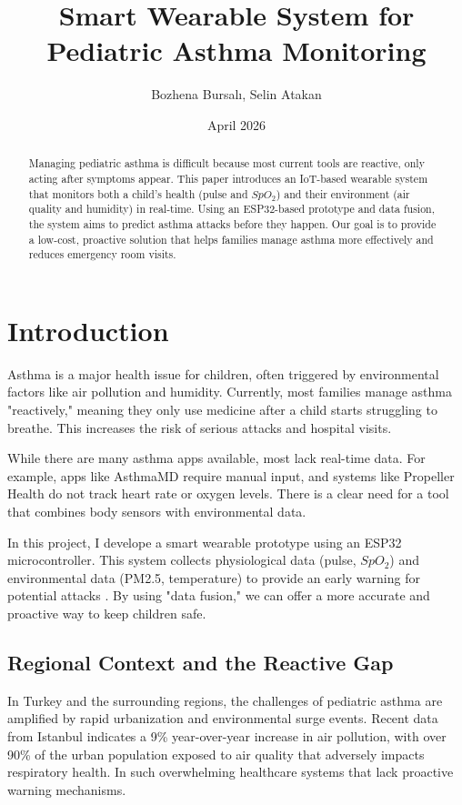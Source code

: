 \documentclass[two column]{article}
\title{Smart Wearable System for Pediatric Asthma Monitoring}
\author{Bozhena Bursalı, Selin Atakan}
\date{April 2026}
\begin{document}
\maketitle
\begin{abstract}
Managing pediatric asthma is difficult because most current tools are reactive, only acting after symptoms appear. This paper introduces an IoT-based wearable system that monitors both a child's health (pulse and $SpO_2$) and their environment (air quality and humidity) in real-time. Using an ESP32-based prototype and data fusion, the system aims to predict asthma attacks before they happen. Our goal is to provide a low-cost, proactive solution that helps families manage asthma more effectively and reduces emergency room visits.
\end{abstract}

\section{Introduction}
Asthma is a major health issue for children, often triggered by environmental factors like air pollution and humidity\cite{Pubmed2026}. Currently, most families manage asthma "reactively," meaning they only use medicine after a child starts struggling to breathe. This increases the risk of serious attacks and hospital visits.

While there are many asthma apps available, most lack real-time data. For example, apps like AsthmaMD require manual input, and systems like Propeller Health do not track heart rate or oxygen levels. There is a clear need for a tool that combines body sensors with environmental data.

In this project, I develope a smart wearable prototype using an ESP32 microcontroller\cite{Li2026}. This system collects physiological data (pulse, $SpO_2$) and environmental data (PM2.5, temperature) to provide an early warning for potential attacks \cite{Pubmed2026}. By using "data fusion," we can offer a more accurate and proactive way to keep children safe.\cite{WHO}

\subsection{Regional Context and the Reactive Gap}
In Turkey and the surrounding regions, the challenges of pediatric asthma are amplified by rapid urbanization and environmental surge events. Recent data from Istanbul indicates a 9\% year-over-year increase in air pollution, with over 90\% of the urban population exposed to air quality that adversely impacts respiratory health. In such overwhelming healthcare systems that lack proactive warning mechanisms.\cite{IstanbulPollution2026}
\end{document}
